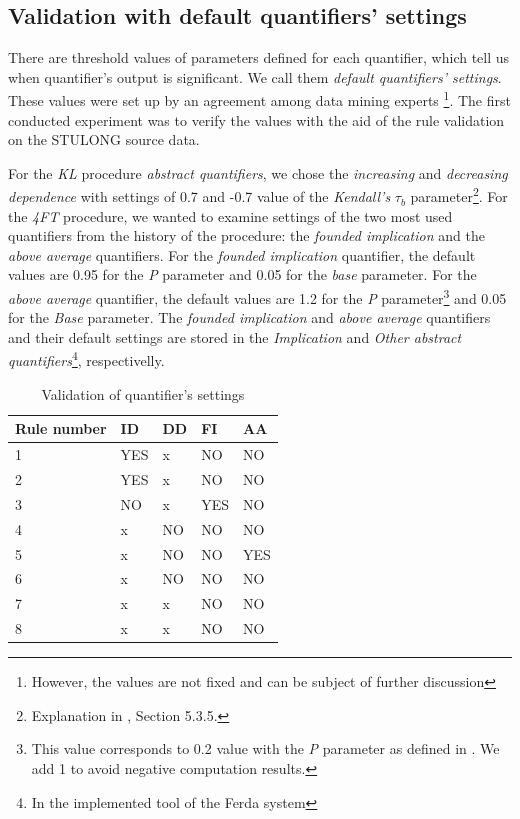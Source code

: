 \documentclass{llncs}
\begin{document}
\subsection{Validation with default quantifiers' settings}
There are threshold values of parameters defined for each quantifier, which tell
us when quantifier's output is significant. We call them \emph{default quantifiers'
settings}. These values were set up by an agreement among data mining experts
\footnote{However, the values are not fixed and can be subject of further discussion}.
The first conducted experiment was to verify the values with the aid of the rule
validation on the STULONG source data.

For the \emph{KL} procedure \emph{abstract quantifiers}, we chose the 
\emph{increasing} and \emph{decreasing dependence} with settings of 0.7
and -0.7 value of the \emph{Kendall's} $\tau_{b}$ parameter\footnote{Explanation
in \cite{Diplomka}, Section 5.3.5.}. For the \emph{4FT} procedure, we wanted
to examine settings of the two most used quantifiers from the history of the procedure:
the \emph{founded implication} and the \emph{above average} quantifiers. For the
\emph{founded implication} quantifier, the default values are 0.95 for the
\emph{P} parameter and 0.05 for the \emph{base} parameter. For the \emph{above
average} quantifier, the default values are 1.2 for the \emph{P} parameter\footnote{
This value corresponds to 0.2 value with the \emph{P} parameter as defined in 
\cite{Classes}. We add 1 to avoid negative computation results.}
and 0.05 for the \emph{Base} parameter. 
The \emph{founded implication} and \emph{above average} quantifiers and their
default settings are stored in the \emph{Implication} and \emph{Other abstract
quantifiers}\footnote{In the implemented tool of the Ferda system}, respectivelly.

\begin{table}[ht]
	\centering
	\begin{tabular}{|p{}|p{1cm}|p{1cm}|p{1cm}|p{1cm}|}
		\hline
		\textbf{Rule number}&\textbf{ID}&\textbf{DD}&\textbf{FI}&\textbf{AA}\\
		\hline
		1&YES&x&NO&NO\\
		\hline
		2&YES&x&NO&NO\\
		\hline
		3&NO&x&YES&NO\\
		\hline
		4&x&NO&NO&NO\\
		\hline
		5&x&NO&NO&YES\\
		\hline
		6&x&NO&NO&NO\\
		\hline
		7&x&x&NO&NO\\
		\hline
		8&x&x&NO&NO\\
		\hline
	\end{tabular}
\caption{Validation of quantifier's settings}
\label{tab:validation1}
\end{table}
\end{document}
